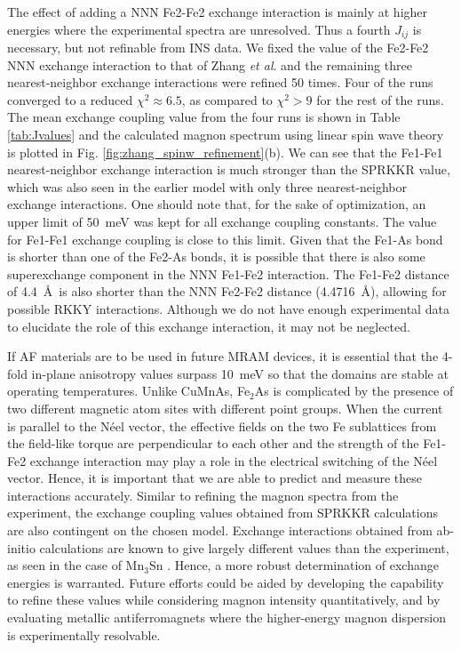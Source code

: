 \documentclass[letterpaper,10pt,doublespacing,edeposit]{uiucthesis2020}
\begin{document}
\begin{mainmatter}
The effect of adding a NNN Fe2-Fe2 exchange interaction is mainly at higher energies where the experimental spectra are unresolved. Thus a fourth $J_{ij}$ is necessary, but not refinable from INS data. We fixed the value of the Fe2-Fe2 NNN exchange interaction to that of Zhang \emph{et al}. \cite{Zhang2013} and the remaining three nearest-neighbor exchange interactions were refined 50 times. Four of the runs converged to a reduced $\chi^2 \approx 6.5$, as compared to $\chi^2 > 9$ for the rest of the runs. The mean exchange coupling value from the four runs is shown in Table \ref{tab:Jvalues} and the calculated magnon spectrum using linear spin wave theory is plotted in Fig. \ref{fig:zhang_spinw_refinement}(b). We can see that the Fe1-Fe1 nearest-neighbor exchange interaction is much stronger than the SPRKKR value, which was also seen in the earlier model with only three nearest-neighbor exchange interactions. One should note that, for the sake of optimization, an upper limit of 50~meV was kept for all exchange coupling constants. The value for Fe1-Fe1 exchange coupling is close to this limit. Given that the Fe1-As bond is shorter than one of the Fe2-As bonds, it is possible that there is also some superexchange component in the NNN Fe1-Fe2 interaction. The Fe1-Fe2 distance of 4.4~\AA\ is also shorter than the NNN Fe2-Fe2 distance (4.4716~\AA), allowing for possible RKKY interactions. Although we do not have enough experimental data to elucidate the role of this exchange interaction, it may not be neglected.

If AF materials are to be used in future MRAM devices, it is essential that the 4-fold in-plane anisotropy values surpass 10~meV so that the domains are stable at operating temperatures. Unlike CuMnAs, Fe$_2$As is complicated by the presence of two different magnetic atom sites with different point groups. When the current is parallel to the N\'eel vector, the effective fields on the two Fe sublattices from the field-like torque are perpendicular to each other and the strength of the Fe1-Fe2 exchange interaction may play a role in the electrical switching of the N\'{e}el vector. Hence, it is important that we are able to predict and measure these interactions accurately. Similar to refining the magnon spectra from the experiment, the exchange coupling values obtained from SPRKKR calculations are also contingent on the chosen model. Exchange interactions obtained from ab-initio calculations are known to give largely different values than the experiment, as seen in the case of Mn$_3$Sn \cite{Park2018}. Hence, a more robust determination of exchange energies is warranted. Future efforts could be aided by developing the capability to refine these values while considering magnon intensity quantitatively, and by evaluating metallic antiferromagnets where the higher-energy magnon dispersion is experimentally resolvable. 



\end{mainmatter}
\end{document}
